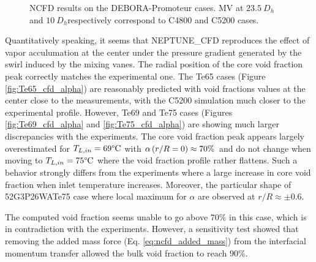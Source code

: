 \begin{figure}[!htb]
{\label{fig:Te69_cfd_Uvap}
}
\caption{NCFD results on the DEBORA-Promoteur cases. MV at $23.5\ D_{h}$ and $10\ D_{h}$respectively correspond to C4800 and C5200 cases.}
\label{fig:debprom_ncfd}
\end{figure}
%



\npar



Quantitatively speaking, it seems that NEPTUNE\_CFD reproduces the effect of vapor acculumation at the center under the pressure gradient generated by the swirl induced by the mixing vanes. The radial position of the core void fraction peak correctly matches the experimental one. The Te65 cases (Figure \ref{fig:Te65_cfd_alpha}) are reasonably predicted with void fractions values at the center close to the measurements, with the C5200 simulation much closer to the experimental profile. However, Te69 and Te75 cases (Figures \ref{fig:Te69_cfd_alpha} and \ref{fig:Te75_cfd_alpha}) are showing much larger discrepancies with the experiments. The core void fraction peak appears largely overestimated for $T_{L,in}=69\degree\mathrm{C}$ with $\alpha\left( r/R= 0 \right) \approx 70\%$ and do not change when moving to $T_{L,in}=75\degree\mathrm{C}$ where the void fraction profile rather flattens. Such a behavior strongly differs from the experiments where a large increase in core void fraction when inlet temperature increases. Moreover, the particular shape of 52G3P26WATe75 case where local maximum for $\alpha$ are observed at $r/R \approx \pm 0.6$.

\begin{remark*}{}
The computed void fraction seems unable to go above 70\% in this case, which is in contradiction with the experiments. However, a sensitivity test showed that removing the added mass force (Eq. \ref{eq:ncfd_added_mass}) from the interfacial momentum transfer allowed the bulk void fraction to reach $90\%$.
\end{remark*}

